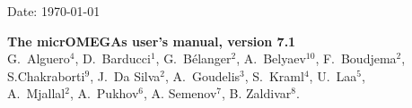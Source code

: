 \documentclass[12pt,a4paper]{article}
\begin{document}
\def\micro{{\tt micrOMEGAs}}
\def\ra{\rightarrow}
\def\calchep{{\tt CalcHEP}}

\def\suspect{{\tt SuSpect}}
\def\mbmb{m_b(m_b)}
\def\mt{m_t}
\def\dMb{\Delta m_b}
\def\dMq{\Delta m_q}
\def\delrho{\Delta\rho}
\def\bsgamma{b\to s\gamma}
\def\bsmu{B_s\to \mu^+\mu^-}
\def\gmuon{(g-2)_\mu}
\def\noi{\noindent}
\def\VERSION{7.1}
\def\neuto{\tilde\chi^0_1}
\def\neuti{\tilde\chi^0_i}
\def\neutt{\tilde\chi^0_2}
\def\neuth{\tilde\chi^0_3}
\def\smodels{{\tt SModelS}}
\def\lilith{{\tt Lilith}}
\def\HB{{\tt HiggsBounds}}
\def\HS{{\tt HiggsSignals}}

\def\eg{{\it e.g.}}
\def\ie{{\it i.e.}}

\def\br{{\rm BR}}

\def\ent{{\mathfrak{s}}}


\def\wimpsim{{\tt WimpSim}}
\def\pppc{{\tt }PPPC4DM$\nu$}
\newcommand{\gb}{\color{blue}}
\def\SK#1{\textcolor{cyan}{#1}}


\begin{flushright}
   \vspace*{-18mm}
   Date: \today
\end{flushright}
\vspace*{2mm}




\begin{center}


{\Large\bf The micrOMEGAs  user's manual, version \VERSION} \\[8mm]


{\large   G.~Alguero$^{4}$, D.~Barducci$^{1}$, G.~B\'elanger$^{2}$, A.~Belyaev$^{10}$, F.~Boudjema$^2$, \\[2mm]
          S.Chakraborti$^9$,  J.~Da Silva$^{2}$, A.~Goudelis$^{3}$, S.~Kraml$^{4}$, U.~Laa$^{5}$,\\[2mm]
 A.~Mjallal$^{2}$,            A.~Pukhov$^6$, A. Semenov$^7$, B. Zaldivar$^{8}$.}\\[4mm]
\end{center}
\end{document}
